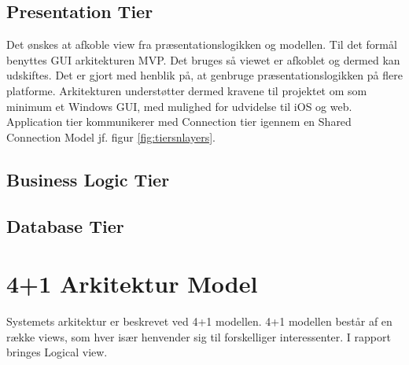 \subsection{Presentation Tier}
Det ønskes at afkoble view fra præsentationslogikken og modellen. Til det formål benyttes GUI arkitekturen MVP. Det bruges så viewet er afkoblet og dermed kan udskiftes. Det er gjort med henblik på, at genbruge præsentationslogikken på flere platforme. Arkitekturen understøtter dermed kravene til projektet om som minimum et Windows GUI, med mulighed for udvidelse til iOS og web. Application tier kommunikerer med Connection tier igennem en Shared Connection Model jf. figur \ref{fig:tiersnlayers}. 

\subsection{Business Logic Tier}

\subsection{Database Tier}

\section{4+1 Arkitektur Model}
Systemets arkitektur er beskrevet ved 4+1 modellen.  4+1 modellen består af en række views, som hver især henvender sig til forskelliger interessenter. I rapport bringes Logical view.

